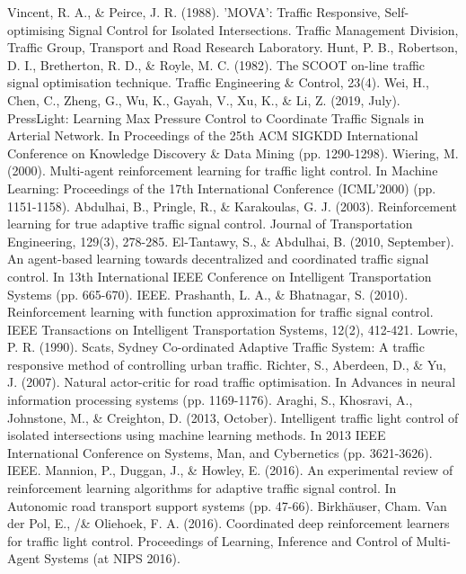 \documentclass{article}
\begin{document}
\begin{thebibliography}{00}
 Vincent, R. A., \& Peirce, J. R. (1988). 'MOVA': Traffic Responsive, Self-optimising Signal Control for Isolated Intersections. Traffic Management Division, Traffic Group, Transport and Road Research Laboratory.
 Hunt, P. B., Robertson, D. I., Bretherton, R. D., \& Royle, M. C. (1982). The SCOOT on-line traffic signal optimisation technique. Traffic Engineering \& Control, 23(4).
 Wei, H., Chen, C., Zheng, G., Wu, K., Gayah, V., Xu, K., \& Li, Z. (2019, July). PressLight: Learning Max Pressure Control to Coordinate Traffic Signals in Arterial Network. In Proceedings of the 25th ACM SIGKDD International Conference on Knowledge Discovery \& Data Mining (pp. 1290-1298).
 Wiering, M. (2000). Multi-agent reinforcement learning for traffic light control. In Machine Learning: Proceedings of the 17th International Conference (ICML'2000) (pp. 1151-1158).
 Abdulhai, B., Pringle, R., \& Karakoulas, G. J. (2003). Reinforcement learning for true adaptive traffic signal control. Journal of Transportation Engineering, 129(3), 278-285.
 El-Tantawy, S., \& Abdulhai, B. (2010, September). An agent-based learning towards decentralized and coordinated traffic signal control. In 13th International IEEE Conference on Intelligent Transportation Systems (pp. 665-670). IEEE.
 Prashanth, L. A., \& Bhatnagar, S. (2010). Reinforcement learning with function approximation for traffic signal control. IEEE Transactions on Intelligent Transportation Systems, 12(2), 412-421.
 Lowrie, P. R. (1990). Scats, Sydney Co-ordinated Adaptive Traffic System: A traffic responsive method of controlling urban traffic.
 Richter, S., Aberdeen, D., \& Yu, J. (2007). Natural actor-critic for road traffic optimisation. In Advances in neural information processing systems (pp. 1169-1176).
 Araghi, S., Khosravi, A., Johnstone, M., \& Creighton, D. (2013, October). Intelligent traffic light control of isolated intersections using machine learning methods. In 2013 IEEE International Conference on Systems, Man, and Cybernetics (pp. 3621-3626). IEEE.
 Mannion, P., Duggan, J., \& Howley, E. (2016). An experimental review of reinforcement learning algorithms for adaptive traffic signal control. In Autonomic road transport support systems (pp. 47-66). Birkhäuser, Cham.
 Van der Pol, E., /\& Oliehoek, F. A. (2016). Coordinated deep reinforcement learners for traffic light control. Proceedings of Learning, Inference and Control of Multi-Agent Systems (at NIPS 2016).

\end{thebibliography}
\end{document}
